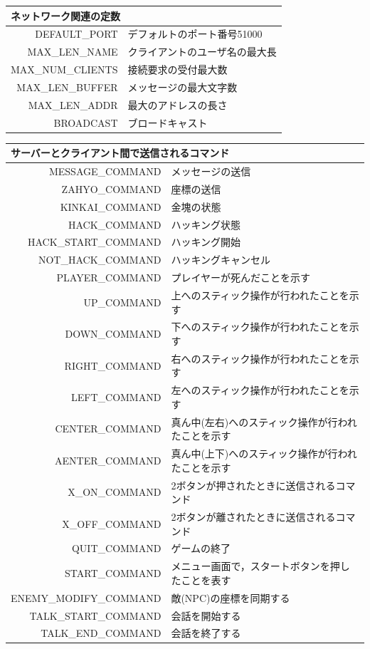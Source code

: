 \documentclass{jarticle}
\begin{document}
\begin{table}[H]
  \begin{tabular}{|r|l|}
    \hline
    \multicolumn{2}{|l|}{ネットワーク関連の定数} \\ \hline
    DEFAULT\_PORT & デフォルトのポート番号51000 \\
    MAX\_LEN\_NAME  & クライアントのユーザ名の最大長 \\
    MAX\_NUM\_CLIENTS & 接続要求の受付最大数 \\
    MAX\_LEN\_BUFFER & メッセージの最大文字数 \\
    MAX\_LEN\_ADDR & 最大のアドレスの長さ \\
    BROADCAST & ブロードキャスト \\ \hline
  \end{tabular}
\end{table}
\begin{table}[H]
  \begin{tabular}{|r|l|}
    \hline
    \multicolumn{2}{|l|}{サーバーとクライアント間で送信されるコマンド} \\ \hline
    MESSAGE\_COMMAND & メッセージの送信\\
    ZAHYO\_COMMAND & 座標の送信\\
    KINKAI\_COMMAND & 金塊の状態\\
    HACK\_COMMAND & ハッキング状態\\
    HACK\_START\_COMMAND & ハッキング開始\\
    NOT\_HACK\_COMMAND & ハッキングキャンセル\\
    PLAYER\_COMMAND & プレイヤーが死んだことを示す\\
    UP\_COMMAND & 上へのスティック操作が行われたことを示す\\
    DOWN\_COMMAND & 下へのスティック操作が行われたことを示す\\
    RIGHT\_COMMAND & 右へのスティック操作が行われたことを示す\\
    LEFT\_COMMAND & 左へのスティック操作が行われたことを示す\\
    CENTER\_COMMAND &真ん中(左右)へのスティック操作が行われたことを示す\\
    AENTER\_COMMAND & 真ん中(上下)へのスティック操作が行われたことを示す\\
    X\_ON\_COMMAND & 2ボタンが押されたときに送信されるコマンド\\
    X\_OFF\_COMMAND & 2ボタンが離されたときに送信されるコマンド \\
    QUIT\_COMMAND & ゲームの終了\\
    START\_COMMAND & メニュー画面で，スタートボタンを押したことを表す\\
    ENEMY\_MODIFY\_COMMAND & 敵(NPC)の座標を同期する\\
    TALK\_START\_COMMAND & 会話を開始する\\
    TALK\_END\_COMMAND & 会話を終了する\\ \hline
  \end{tabular}
\end{table}
\end{document}

